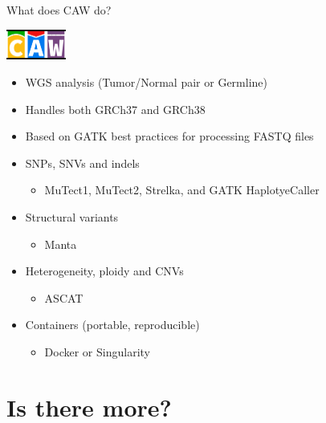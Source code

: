 \documentclass{beamer}
\begin{document}
\begin{frame}{What does CAW do?}
	\begin{center}
		\includegraphics[height=1cm]{pictures/CAW}
	\end{center}
	\pause
	\begin{itemize}
		\item WGS analysis (Tumor/Normal pair or Germline)
		\pause
		\item Handles both GRCh37 and GRCh38
		\pause
		\item Based on GATK best practices for processing FASTQ files
		\pause
		\item<5-> SNPs, SNVs and indels
		\begin{itemize}
			\item<6-> MuTect1, MuTect2, Strelka, and GATK HaplotyeCaller
		\end{itemize}
		\pause
		\item<7-> Structural variants
		\begin{itemize}
			\item<8-> Manta
		\end{itemize}
		\pause
		\item<9-> Heterogeneity, ploidy and CNVs
		\begin{itemize}
			\item<10-> ASCAT
		\end{itemize}
		\pause
		\item<11-> Containers (portable, reproducible)
		\begin{itemize}
			\item<12-> Docker or Singularity
		\end{itemize}
	\end{itemize}
\end{frame}

\section{Is there more?}
\end{document}
